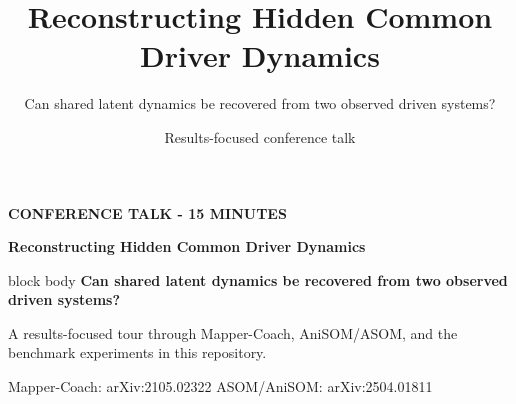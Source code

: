 \documentclass[aspectratio=169,11pt]{beamer}
\title[Common Driver Reconstruction]{Reconstructing Hidden Common Driver Dynamics}
\subtitle{Can shared latent dynamics be recovered from two observed driven systems?}
\author{Results-focused conference talk}
\date{}
\begin{document}
\begin{frame}[plain]
  \vspace{0.55cm}
  {\small\bfseries\textcolor{DeckTeal}{CONFERENCE TALK - 15 MINUTES}}

  \vspace{0.75cm}
  {\Huge\bfseries Reconstructing Hidden Common Driver Dynamics\par}

  \vspace{0.7cm}
  \begin{beamercolorbox}[wd=0.84\paperwidth,sep=0.8em,left,rounded=true]{block body}
    {\Large\bfseries Can shared latent dynamics be recovered from two observed driven systems?}
  \end{beamercolorbox}

  \vspace{0.55cm}
  {\large\color{DeckMuted}A results-focused tour through Mapper-Coach, AniSOM/ASOM, and the benchmark experiments in this repository.}

  \vfill
  {\small
    Mapper-Coach: arXiv:2105.02322 \hspace{1.5em}
    ASOM/AniSOM: arXiv:2504.01811
  }
\end{frame}
\end{document}
